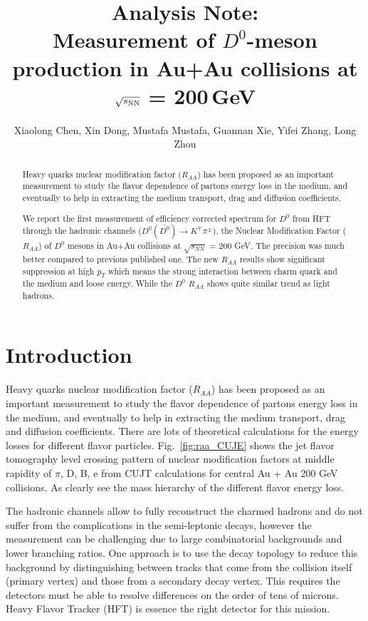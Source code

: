 \documentclass[a4paper]{article}
\title{Analysis Note: \\
Measurement of $D^0$-meson production in Au+Au collisions at $\sqrt{s_{\rm NN}}$ = 200\,GeV}
\author{Xiaolong Chen, Xin Dong, Mustafa Mustafa, Guannan Xie, Yifei Zhang, Long Zhou}
\begin{document}
\maketitle

\begin{abstract}

Heavy quarks nuclear modification factor ($R_{AA}$) has been proposed as an important measurement to study the flavor dependence of partons energy loss in the medium, and eventually to help in extracting the medium transport, drag and diffusion coefficients.

We report the first measurement of efficiency corrected spectrum for $D^0$ from HFT through the hadronic channels ($D^0(\bar{D^0}) \rightarrow K^{\mp}\pi^{\pm}$), the Nuclear Modification Factor ($R_{AA}$) of $D^0$ mesons in Au+Au collisions at $\sqrt{s_{NN}}$ = 200 GeV. The precision was much better compared to previous published one. The new $R_{AA}$ results show significant suppression at high $p_T$ which means the strong interaction between charm quark and the medium and loose energy. While the $D^0$ $R_{AA}$ shows quite similar trend as light hadrons.

\end{abstract}

\clearpage

\tableofcontents

\clearpage

\section{Introduction}

Heavy quarks nuclear modification factor ($R_{AA}$) has been proposed as an important measurement to study the flavor dependence of partons energy loss in the medium, and eventually to help in extracting the medium transport, drag and diffusion coefficients. There are lots of theoretical calculations for the energy losses for different flavor particles. Fig.~\ref{fig:raa_CUJE} shows the jet flavor tomography level crossing pattern of nuclear modification factors at middle rapidity of $\pi$, D, B, e from CUJT calculations for central Au + Au 200 GeV collisions. As clearly see the mass hierarchy of the different flavor energy loss.

The hadronic channels allow to fully reconstruct the charmed hadrons and do not suffer from the complications in the semi-leptonic decays, however the measurement can be challenging due to large combinatorial backgrounds and lower branching ratios. One approach is to use the decay topology to reduce this background by distinguishing between tracks that come from the collision itself (primary vertex) and those from a secondary decay vertex. This requires the detectors must be able to resolve differences on the order of tens of microns. Heavy Flavor Tracker (HFT) is essence the right detector for this mission.
\end{document}
